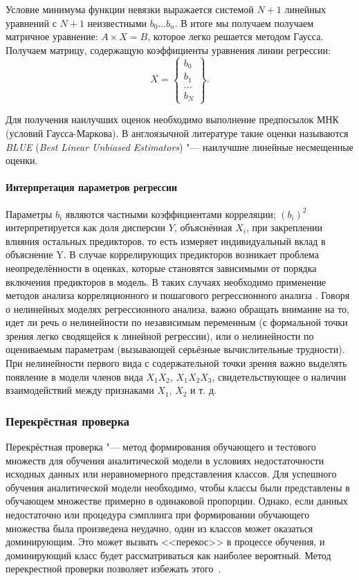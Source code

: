 Условие минимума функции невязки выражается системой $N+1$  линейных уравнений с $N+1$ неизвестными $b_0...b_n$.
В итоге мы получаем получаем матричное уравнение: $A \times X = B$, которое легко решается методом Гаусса. Получаем матрицу, содержащую коэффициенты уравнения линии регрессии:
\begin{equation*}
X = \left\{ \begin{array}{c}
b_0\\
b_1\\
...\\
b_N
\end{array} \right\}.
\end{equation*}

Для получения наилучших оценок необходимо выполнение предпосылок МНК (условий Гаусса-Маркова). В англоязычной литературе такие оценки называются \textit{BLUE} (\textit{Best Linear Unbiased Estimators}) "--- наилучшие линейные несмещенные оценки.

\paragraph{Интерпретация параметров регрессии}

Параметры $b_i$ являются частными коэффициентами корреляции; $(b_i)^2$ интерпретируется как доля дисперсии $Y$, объяснённая $X_i$, при закреплении влияния остальных предикторов, то есть измеряет индивидуальный вклад  в объяснение Y. В случае коррелирующих предикторов возникает проблема неопределённости в оценках, которые становятся зависимыми от порядка включения предикторов в модель. В таких случаях необходимо применение методов анализа корреляционного и пошагового регрессионного анализа \cite{statseval}.
Говоря о нелинейных моделях регрессионного анализа, важно обращать внимание на то, идет ли речь о нелинейности по независимым переменным (с формальной точки зрения легко сводящейся к линейной регрессии), или о нелинейности по оцениваемым параметрам (вызывающей серьёзные вычислительные трудности). При нелинейности первого вида с содержательной точки зрения важно выделять появление в модели членов вида $X_1 X_2$, $X_1 X_2 X_3$, свидетельствующее о наличии взаимодействий между признаками $X_1$, $X_2$ и т. д.

\subsubsection{Перекрёстная проверка}
\label{sscross-validation}
Перекрёстная проверка "--- метод формирования обучающего и тестового множеств для обучения аналитической модели в условиях недостаточности исходных данных или неравномерного представления классов. Для успешного обучения аналитической модели необходимо, чтобы классы были представлены в обучающем множестве примерно в одинаковой пропорции. Однако, если данных недостаточно или процедура сэмплинга при формировании обучающего множества была произведена неудачно, один из классов может оказаться доминирующим. Это может вызвать <<перекос>> в процессе обучения, и доминирующий класс будет рассматриваться как наиболее вероятный. Метод перекрестной проверки позволяет избежать этого~\cite{cross-validation}.

